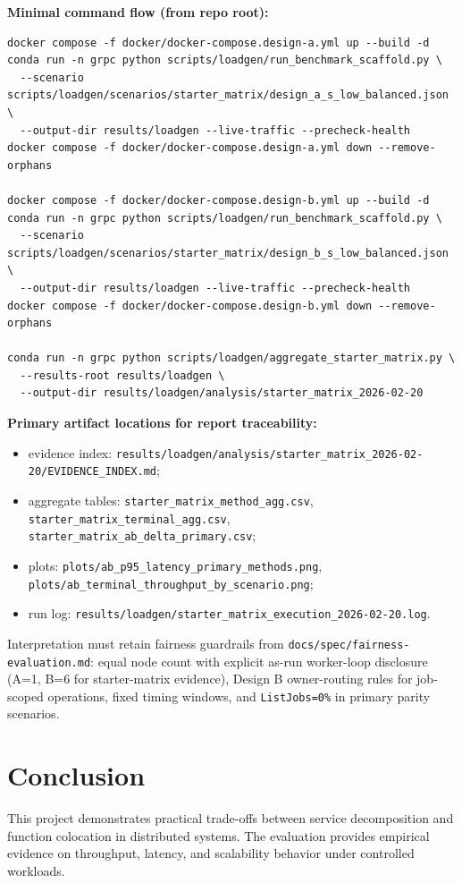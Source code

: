 \documentclass[11pt]{article}
\begin{document}
\noindent
\textbf{Minimal command flow (from repo root):}
\begin{verbatim}
docker compose -f docker/docker-compose.design-a.yml up --build -d
conda run -n grpc python scripts/loadgen/run_benchmark_scaffold.py \
  --scenario scripts/loadgen/scenarios/starter_matrix/design_a_s_low_balanced.json \
  --output-dir results/loadgen --live-traffic --precheck-health
docker compose -f docker/docker-compose.design-a.yml down --remove-orphans

docker compose -f docker/docker-compose.design-b.yml up --build -d
conda run -n grpc python scripts/loadgen/run_benchmark_scaffold.py \
  --scenario scripts/loadgen/scenarios/starter_matrix/design_b_s_low_balanced.json \
  --output-dir results/loadgen --live-traffic --precheck-health
docker compose -f docker/docker-compose.design-b.yml down --remove-orphans

conda run -n grpc python scripts/loadgen/aggregate_starter_matrix.py \
  --results-root results/loadgen \
  --output-dir results/loadgen/analysis/starter_matrix_2026-02-20
\end{verbatim}

\noindent
\textbf{Primary artifact locations for report traceability:}
\begin{itemize}
    \item evidence index: \texttt{results/loadgen/analysis/starter\_matrix\_2026-02-20/EVIDENCE\_INDEX.md};
    \item aggregate tables: \texttt{starter\_matrix\_method\_agg.csv}, \texttt{starter\_matrix\_terminal\_agg.csv}, \texttt{starter\_matrix\_ab\_delta\_primary.csv};
    \item plots: \texttt{plots/ab\_p95\_latency\_primary\_methods.png}, \texttt{plots/ab\_terminal\_throughput\_by\_scenario.png};
    \item run log: \texttt{results/loadgen/starter\_matrix\_execution\_2026-02-20.log}.
\end{itemize}

\noindent
Interpretation must retain fairness guardrails from \texttt{docs/spec/fairness-evaluation.md}: equal node count with explicit as-run worker-loop disclosure (A=1, B=6 for starter-matrix evidence), Design B owner-routing rules for job-scoped operations, fixed timing windows, and \texttt{ListJobs=0\%} in primary parity scenarios.


\section{Conclusion}
This project demonstrates practical trade-offs between service decomposition and function colocation in distributed systems.
The evaluation provides empirical evidence on throughput, latency, and scalability behavior under controlled workloads.
\end{document}
